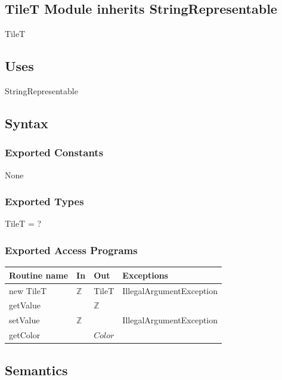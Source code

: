 \documentclass[12pt]{article}
\begin{document}
\subsection*{TileT Module inherits StringRepresentable}

TileT

\subsection* {Uses}

StringRepresentable

\subsection* {Syntax}

\subsubsection* {Exported Constants}

None

\subsubsection* {Exported Types}

TileT = ?

\subsubsection* {Exported Access Programs}

\begin{tabular}{| l | l | l | p{5cm} |}
  \hline
  \textbf{Routine name} & \textbf{In}  & \textbf{Out} & \textbf{Exceptions}      \\
  \hline
  new TileT             & $\mathbb{Z}$ & TileT        & IllegalArgumentException \\
  \hline
  getValue              &              & $\mathbb{Z}$ &                          \\
  \hline
  setValue              & $\mathbb{Z}$ &              & IllegalArgumentException \\
  \hline
  getColor              &              & $Color$      &                          \\
  \hline
\end{tabular}

\subsection* {Semantics}
\end{document}
